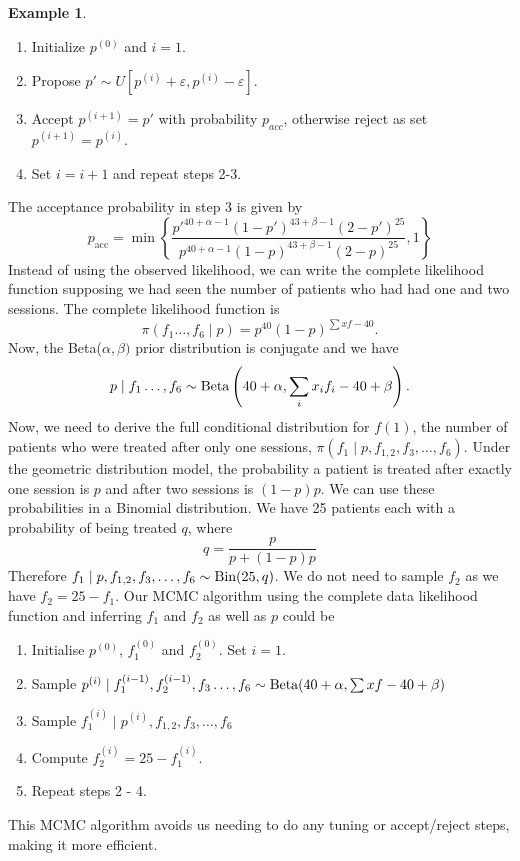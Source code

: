 \documentclass[
]{book}
\providecommand{\tightlist}{%
  \setlength{\itemsep}{0pt}\setlength{\parskip}{0pt}}
\theoremstyle{definition}
\theoremstyle{definition}
\newtheorem{example}{Example}[chapter]
\theoremstyle{definition}
\theoremstyle{definition}
\theoremstyle{remark}
\begin{document}
\begin{example}
\begin{enumerate}
\def\labelenumi{\arabic{enumi}.}
\tightlist
\item
  Initialize \(p^{(0)}\) and \(i = 1\).
\item
  Propose \(p' \sim U[p^{(i)} + \varepsilon, p^{(i)} - \varepsilon]\).
\item
  Accept \(p^{(i+1)}=p'\) with probability \(p_{acc}\), otherwise reject as set \(p^{(i+1)}=p^{(i)}\).
\item
  Set \(i=i+1\) and repeat steps 2-3.
\end{enumerate}

The acceptance probability in step 3 is given by
\[
p_{\textrm{acc}} = \min\left\{\frac{p'^{40 + \alpha - 1}(1-p')^{43 + \beta - 1}(2-p')^{25}}{p^{40 + \alpha - 1}(1-p)^{43 + \beta - 1}(2-p)^{25}} ,1\right\}
\]
Instead of using the observed likelihood, we can write the complete likelihood function supposing we had seen the number of patients who had had one and two sessions. The complete likelihood function is
\[
\pi(f_1 \ldots, f_6 \mid p) = p^{40}(1-p)^{\sum xf - 40}. 
\]
Now, the Beta(\(\alpha, \beta)\) prior distribution is conjugate and we have
\[
p \mid f_1 \ldots, f_6  \sim \hbox{Beta}\left(40 + \alpha, \sum_i  x_if_i - 40 + \beta\right).
\]
Now, we need to derive the full conditional distribution for \(f(1)\), the number of patients who were treated after only one sessions, \(\pi(f_1 \mid p, f_{1, 2}, f_3, \ldots, f_6)\). Under the geometric distribution model, the probability a patient is treated after exactly one session is \(p\) and after two sessions is \((1-p)p\). We can use these probabilities in a Binomial distribution. We have 25 patients each with a probability of being treated \(q\), where
\[
q = \frac{p}{p + (1-p)p}
\]
Therefore \(f_1 \mid p, f_{1, 2}, f_3, \ldots, f_6 \sim \hbox{Bin}(25, q)\). We do not need to sample \(f_2\) as we have \(f_2 = 25 - f_1\). Our MCMC algorithm using the complete data likelihood function and inferring \(f_1\) and \(f_2\) as well as \(p\) could be

\begin{enumerate}
\def\labelenumi{\arabic{enumi}.}
\tightlist
\item
  Initialise \(p^{(0)}\), \(f_1^{(0)}\) and \(f_2^{(0)}\). Set \(i = 1\).
\item
  Sample \(p^{(i)} \mid f_1^{(i-1)}, f_2^{(i-1)}, f_3 \ldots, f_6  \sim \hbox{Beta}(40 + \alpha, \sum xf - 40 + \beta)\)
\item
  Sample \(f_1^{(i)} \mid p^{(i)}, f_{1, 2}, f_3, \ldots, f_6\)
\item
  Compute \(f_2^{(i)} = 25 - f_1^{(i)}\).
\item
  Repeat steps 2 - 4.
\end{enumerate}

This MCMC algorithm avoids us needing to do any tuning or accept/reject steps, making it more efficient.
\end{example}
\end{document}
